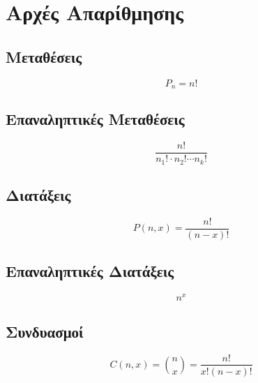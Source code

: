 \section{Αρχές Απαρίθμησης}

\begin{multicols}{2}
  \subsection*{Μεταθέσεις}
  \[
   P_{n}=n!
  \]

  \subsection*{Επαναληπτικές Μεταθέσεις}
  \[
  \frac{n!}{n_{1}!\cdot n_{2}! \cdots n_{k}!}
  \]
\end{multicols}

\begin{multicols}{2}
  \subsection*{Διατάξεις}
  \[
  P(n,x)=\frac{n!}{(n-x)!}
  \]

  \subsection*{Επαναληπτικές Διατάξεις}
  \[
  n^{x}
  \]
\end{multicols}

\begin{multicols}{2}
  \subsection*{Συνδυασμοί}
  \[
  C(n,x)=\binom{n}{x}=\frac{n!}{x!(n-x)!}
  \]
\end{multicols}
